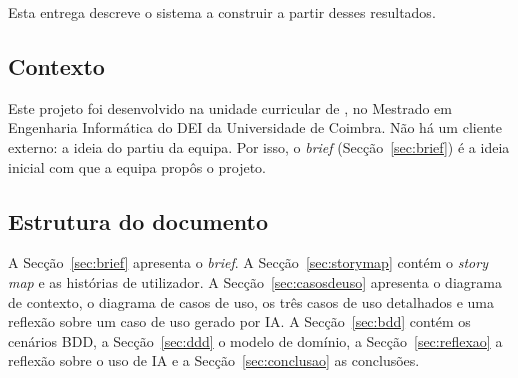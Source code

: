 Esta entrega descreve o sistema a construir a partir desses resultados.

\subsection*{Contexto}

Este projeto foi desenvolvido na unidade curricular de \uc{}, no Mestrado em Engenharia Informática do DEI da Universidade de Coimbra.
Não há um cliente externo: a ideia do \projeto{} partiu da equipa. Por isso, o \textit{brief} (Secção~\ref{sec:brief}) é a
ideia inicial com que a equipa propôs o projeto.

\subsection*{Estrutura do documento}

A Secção~\ref{sec:brief} apresenta o \textit{brief}. A Secção~\ref{sec:storymap} contém o \textit{story map} e as histórias de
utilizador. A Secção~\ref{sec:casosdeuso} apresenta o diagrama de contexto, o diagrama de casos de uso, os três casos de uso
detalhados e uma reflexão sobre um caso de uso gerado por IA. A Secção~\ref{sec:bdd} contém os cenários BDD, a
Secção~\ref{sec:ddd} o modelo de domínio, a Secção~\ref{sec:reflexao} a reflexão sobre o uso de IA e a
Secção~\ref{sec:conclusao} as conclusões.
